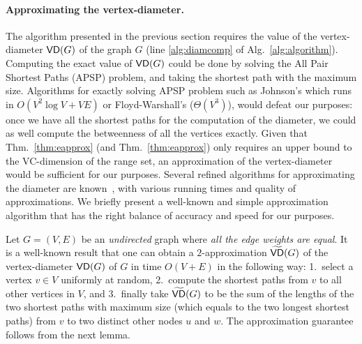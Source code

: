 \paragraph{Approximating the vertex-diameter.}%
The algorithm presented in the previous section requires the value of the
vertex-diameter $\mathsf{VD}(G)$ of the graph $G$ (line
\ref{alg:diamcomp} of Alg.~\ref{alg:algorithm}). 
Computing the exact value of $\mathsf{VD}(G)$ could be done by solving the All Pair
Shortest Paths (APSP) problem, and taking the shortest path with the maximum size.
Algorithms for exactly solving APSP problem such as Johnson's which runs in
$O(V^2\log V+VE)$ or Floyd-Warshall's ($\Theta(V^3)$), would defeat our
purposes: once we have all the shortest paths for the computation of
the diameter, we could as well compute the betweenness of all the vertices exactly. 
Given that Thm.~\ref{thm:eapprox} (and Thm.~\ref{thm:eapprox})  only
requires an upper bound to the VC-dimension of the range set, an approximation
of the vertex-diameter would be sufficient for our purposes. Several refined
algorithms for approximating the diameter are
known~\citep{AingwordCIM99,BoitmanisFL06,RodittyW12}, with various running times
and quality of approximations. We briefly present a well-known and simple
approximation algorithm that has the right balance of accuracy and speed
for our purposes.

Let $G=(V,E)$ be an \emph{undirected} graph where \emph{all the edge weights are
equal}.
It is a well-known result that one can obtain a $2$-approximation
$\widetilde{\mathsf{VD}}(G)$ of the vertex-diameter $\mathsf{VD}(G)$ of $G$ in time $O(V+E)$ in
the following way: 1.~select a vertex $v\in V$ uniformly at random, 2.~compute
the shortest paths from $v$ to all other vertices in $V$, and 3.~finally take
$\widetilde{\mathsf{VD}}(G)$ to be the sum of the lengths of the two shortest paths with
maximum size (which equals to the two longest shortest paths) from $v$ to two
distinct other nodes $u$ and $w$. The approximation guarantee follows from the next lemma.

